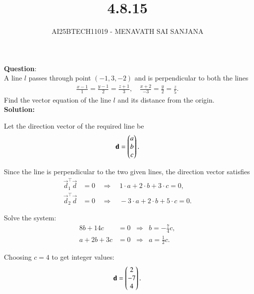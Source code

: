 \documentclass[journal]{IEEEtran}
\begin{document}

\vspace{3cm}

\title{4.8.15}
\author{AI25BTECH11019 - MENAVATH SAI SANJANA}
{\let\newpage\relax\maketitle}

\renewcommand{\thefigure}{\theenumi}
\renewcommand{\thetable}{\theenumi}
\setlength{\intextsep}{10pt} %

\renewcommand{\thetable}{\theenumi}

\textbf{Question}:\\
A line $l$ passes through point $(-1,3,-2)$ and is perpendicular to both the lines  
\begin{align}
\frac{x-1}{1} = \frac{y-1}{2} = \frac{z+1}{3}, \quad
\frac{x+2}{-3} = \frac{y}{2} = \frac{z}{5}.
\end{align}
Find the vector equation of the line $l$ and its distance from the origin.
\\
\bigskip
\textbf{Solution: }

Let the direction vector of the required line be
\begin{align}  
\mathbf{d} = \begin{pmatrix}a\\b\\c\end{pmatrix}.
\end{align}  

Since the line is perpendicular to the two given lines, the direction vector satisfies
\begin{align}  
\vec{d}_1^\top \vec{d} &= 0 \quad \Rightarrow \quad 1\cdot a + 2\cdot b + 3\cdot c = 0,\\  
\vec{d}_2^\top \vec{d} &= 0 \quad \Rightarrow \quad -3\cdot a + 2\cdot b + 5\cdot c = 0.
\end{align}  

Solve the system:  
\begin{align}  
8b + 14c &= 0 \;\;\Rightarrow\;\; b = -\frac{7}{4}c,\\  
a + 2b + 3c &= 0 \;\;\Rightarrow\;\; a = \frac{1}{2}c.
\end{align}  

Choosing $c=4$ to get integer values:  
\begin{align}  
\mathbf{d} = \begin{pmatrix}2\\-7\\4\end{pmatrix}.
\end{align}  
\end{document}
